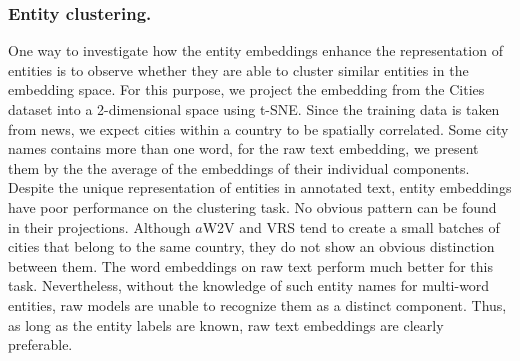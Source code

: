 \subsubsection{Entity clustering.} 
One way to investigate how the entity embeddings enhance the representation of entities is to observe whether they are able to cluster similar entities in the embedding space. For this purpose, we project the embedding from the Cities dataset into a 2-dimensional space using t-SNE. Since the training data is taken from news, we expect cities within a country to be spatially correlated. Some city names contains more than one word, for the raw text embedding, we present them by the the average of the embeddings of their individual components. Despite the unique representation of entities in annotated text, entity embeddings have poor performance on the clustering task. No obvious pattern can be found in their projections. Although $a$W2V and VRS tend to create a small batches of cities that belong to the same country, they do not show an obvious distinction between them. The word embeddings on raw text perform much better for this task. Nevertheless, without the knowledge of such entity names for multi-word entities, raw models are unable to recognize them as a distinct component. Thus, as long as the entity labels are known, raw text embeddings are clearly preferable. 

